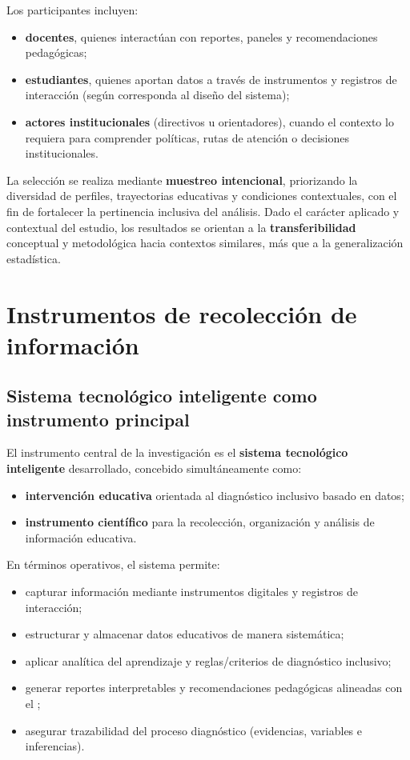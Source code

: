 \begin{refsection}
Los participantes incluyen:

\begin{itemize}
\item \textbf{docentes}, quienes interactúan con reportes, paneles y recomendaciones pedagógicas;
\item \textbf{estudiantes}, quienes aportan datos a través de instrumentos y registros de interacción (según corresponda al diseño del sistema);
\item \textbf{actores institucionales} (directivos u orientadores), cuando el contexto lo requiera para comprender políticas, rutas de atención o decisiones institucionales.
\end{itemize}

La selección se realiza mediante \textbf{muestreo intencional}, priorizando la diversidad de perfiles, trayectorias educativas y condiciones contextuales, con el fin de fortalecer la pertinencia inclusiva del análisis. Dado el carácter aplicado y contextual del estudio, los resultados se orientan a la \textbf{transferibilidad} conceptual y metodológica hacia contextos similares, más que a la generalización estadística.

\section{Instrumentos de recolección de información}

\subsection{Sistema tecnológico inteligente como instrumento principal}

El instrumento central de la investigación es el \textbf{sistema tecnológico inteligente} desarrollado, concebido simultáneamente como:

\begin{itemize}
\item \textbf{intervención educativa} orientada al diagnóstico inclusivo basado en datos;
\item \textbf{instrumento científico} para la recolección, organización y análisis de información educativa.
\end{itemize}

En términos operativos, el sistema permite:

\begin{itemize}
\item capturar información mediante instrumentos digitales y registros de interacción;
\item estructurar y almacenar datos educativos de manera sistemática;
\item aplicar analítica del aprendizaje y reglas/criterios de diagnóstico inclusivo;
\item generar reportes interpretables y recomendaciones pedagógicas alineadas con el \DUA;
\item asegurar trazabilidad del proceso diagnóstico (evidencias, variables e inferencias).
\end{itemize}


\end{refsection}
